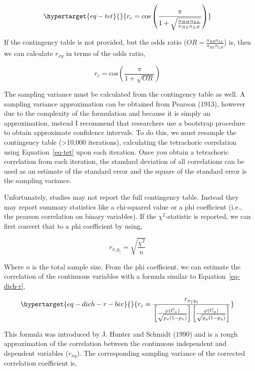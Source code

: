 \documentclass[
  letterpaper,
  DIV=11,
  numbers=noendperiod]{scrreprt}
\begin{document}
\begin{equation}\protect\hypertarget{eq-tet}{}{
r_c = \text{cos}\left(\frac{\pi}{1+\sqrt{\frac{n_{HH}n_{LL}}{n_{HL}n_{LH}}}}\right)
}\label{eq-tet}\end{equation}

If the contingency table is not provided, but the odds ratio
(\(OR=\frac{n_{HH}n_{LL}}{n_{HL}n_{LH}}\)) is, then we can calculate
\(r_{xy}\) in terms of the odds ratio,

\[
r_c = \text{cos}\left(\frac{\pi}{1+\sqrt{OR}}\right)
\]

The sampling variance must be calculated from the contingency table as
well. A sampling variance approximation can be obtained from Pearson
(1913), however due to the complexity of the formulation and because it
is simply an approximation, instead I recommend that researchers use a
bootstrap procedure to obtain approximate confidence intervals. To do
this, we must resample the contingency table (\textgreater10,000
iterations), calculating the tetrachoric correlation using
Equation~\ref{eq-tet} upon each iteration. Once you obtain a tetrachoric
correlation from each iteration, the standard deviation of all
correlations can be used as an estimate of the standard error and the
square of the standard error is the sampling variance.

Unfortunately, studies may not report the full contingency table.
Instead they may report summary statistics like a chi-squared value or a
phi coefficient (i.e., the pearson correlation on binary variables). If
the \(\chi^2\)-statistic is reported, we can first convert that to a phi
coefficient by using,

\[
r_{x_\ddagger y_\ddagger} = \sqrt{\frac{\chi^2}{n}}
\]

Where \(n\) is the total sample size. From the phi coefficient, we can
estimate the correlation of the continuous variables with a formula
similar to Equation~\ref{eq-dich-r},

\begin{equation}\protect\hypertarget{eq-dich-r-biv}{}{
r_c = \frac{r_{x_\ddagger y_\ddagger}}{\left[\frac{\varphi(C_x)}{\sqrt{p_x(1-p_x)}} \right]\left[\frac{\varphi(C_y)}{\sqrt{p_y(1-p_y)}} \right]}
}\label{eq-dich-r-biv}\end{equation}

This formula was introduced by J. Hunter and Schmidt (1990) and is a
rough approximation of the correlation between the continuous
independent and dependent variables (\(r_{xy}\)). The corresponding
sampling variance of the corrected correlation coefficient is,
\end{document}
